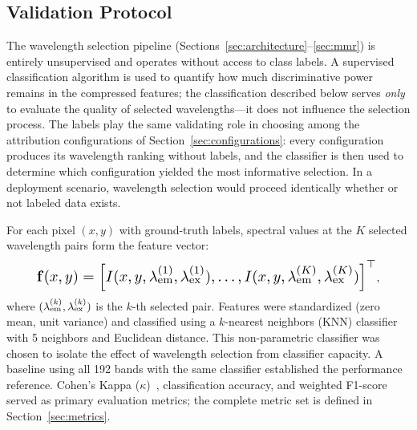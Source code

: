 \subsection{Validation Protocol}
\label{sec:validation}

The wavelength selection pipeline (Sections~\ref{sec:architecture}--\ref{sec:mmr}) is entirely unsupervised and operates without access to class labels.
A supervised classification algorithm is used to quantify how much discriminative power remains in the compressed features; the classification described below serves \emph{only} to evaluate the quality of selected wavelengths---it does not influence the selection process.
The labels play the same validating role in choosing among the attribution configurations of Section~\ref{sec:configurations}: every configuration produces its wavelength ranking without labels, and the classifier is then used to determine which configuration yielded the most informative selection.
In a deployment scenario, wavelength selection would proceed identically whether or not labeled data exists.

For each pixel $(x, y)$ with ground-truth labels, spectral values at the $K$ selected wavelength pairs form the feature vector:
\begin{equation}
\resizebox{0.88\columnwidth}{!}{$
\vect{f}(x, y) = \left[ I(x, y, \lambda_{\mathrm{em}}^{(1)}, \lambda_{\mathrm{ex}}^{(1)}), \ldots, I(x, y, \lambda_{\mathrm{em}}^{(K)}, \lambda_{\mathrm{ex}}^{(K)}) \right]^\top$},
\label{eq:features}
\end{equation}
where $(\lambda_{\text{em}}^{(k)}, \lambda_{\text{ex}}^{(k)})$ is the $k$-th selected pair.
Features were standardized (zero mean, unit variance) and classified using a $k$-nearest neighbors (KNN) classifier~\cite{cover1967nearest} with 5 neighbors and Euclidean distance.
This non-parametric classifier was chosen to isolate the effect of wavelength selection from classifier capacity.
A baseline using all 192 bands with the same classifier established the performance reference.
Cohen's Kappa ($\kappa$)~\cite{cohen1960coefficient}, classification accuracy, and weighted F1-score served as primary evaluation metrics; the complete metric set is defined in Section~\ref{sec:metrics}.